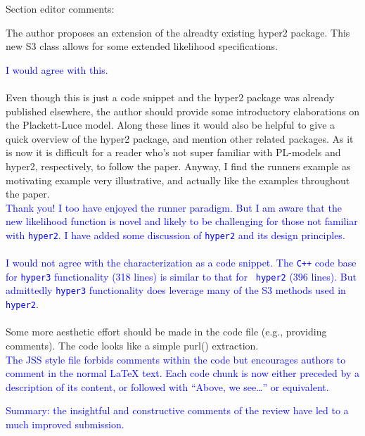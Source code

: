 \documentclass[12pt]{article}
\begin{document}
Section editor comments:

The author proposes an extension of the alreadty existing hyper2 package.
This new S3 class allows for some extended likelihood specifications.

\textcolor{blue}{I would agree with this.}\\ \\


Even though this is just a code snippet and the hyper2 package was
already published elsewhere, the author should provide some
introductory elaborations on the Plackett-Luce model. Along these
lines it would also be helpful to give a quick overview of the hyper2
package, and mention other related packages. As it is now it is
difficult for a reader who's not super familiar with PL-models and
hyper2, respectively, to follow the paper. Anyway, I find the runners
example as motivating example very illustrative, and actually like the
examples throughout the paper.\\ \textcolor{blue}{Thank you!  I too
  have enjoyed the runner paradigm.  But I am aware that the new
  likelihood function is novel and likely to be challenging for those
  not familiar with {\tt hyper2}.  I have added some discussion of
  {\tt hyper2} and its design principles.\\ \\I would not agree with
  the characterization as a code snippet.  The {\tt C++} code base for
  {\tt hyper3} functionality (318 lines) is similar to that for {\tt
    hyper2} (396 lines).  But admittedly {\tt hyper3} functionality
  does leverage many of the S3 methods used in {\tt hyper2}.}\\ \\

Some more aesthetic effort should be made in the code file (e.g.,
providing comments). The code looks like a simple purl()
extraction.\\ \textcolor{blue}{The JSS style file forbids comments
  within the code but encourages authors to comment in the normal
  LaTeX text.  Each code chunk is now either preceded by a description
  of its content, or followed with ``Above, we see\ldots'' or
  equivalent.}

\textcolor{blue}{Summary: the insightful and constructive comments of
  the review have led to a much improved submission.}
\end{document}
